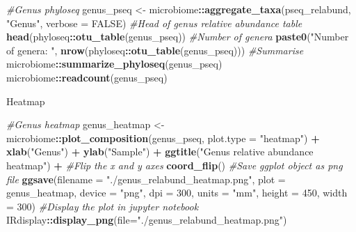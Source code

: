 \documentclass[
]{book}
\newenvironment{Shaded}{\begin{snugshade}}{\end{snugshade}}
\newcommand{\AttributeTok}[1]{\textcolor[rgb]{0.13,0.29,0.53}{#1}}
\newcommand{\CommentTok}[1]{\textcolor[rgb]{0.56,0.35,0.01}{\textit{#1}}}
\newcommand{\ConstantTok}[1]{\textcolor[rgb]{0.56,0.35,0.01}{#1}}
\newcommand{\DecValTok}[1]{\textcolor[rgb]{0.00,0.00,0.81}{#1}}
\newcommand{\FunctionTok}[1]{\textcolor[rgb]{0.13,0.29,0.53}{\textbf{#1}}}
\newcommand{\NormalTok}[1]{#1}
\newcommand{\OtherTok}[1]{\textcolor[rgb]{0.56,0.35,0.01}{#1}}
\newcommand{\SpecialCharTok}[1]{\textcolor[rgb]{0.81,0.36,0.00}{\textbf{#1}}}
\newcommand{\StringTok}[1]{\textcolor[rgb]{0.31,0.60,0.02}{#1}}
\begin{document}
\begin{Shaded}
\begin{Highlighting}[]
\CommentTok{\#Genus phyloseq}
\NormalTok{genus\_pseq }\OtherTok{\textless{}{-}}\NormalTok{ microbiome}\SpecialCharTok{::}\FunctionTok{aggregate\_taxa}\NormalTok{(pseq\_relabund, }\StringTok{"Genus"}\NormalTok{, }\AttributeTok{verbose =} \ConstantTok{FALSE}\NormalTok{)}
\CommentTok{\#Head of genus relative abundance table}
\FunctionTok{head}\NormalTok{(phyloseq}\SpecialCharTok{::}\FunctionTok{otu\_table}\NormalTok{(genus\_pseq))}
\CommentTok{\#Number of genera}
\FunctionTok{paste0}\NormalTok{(}\StringTok{"Number of genera: "}\NormalTok{, }\FunctionTok{nrow}\NormalTok{(phyloseq}\SpecialCharTok{::}\FunctionTok{otu\_table}\NormalTok{(genus\_pseq)))}
\CommentTok{\#Summarise}
\NormalTok{microbiome}\SpecialCharTok{::}\FunctionTok{summarize\_phyloseq}\NormalTok{(genus\_pseq)}
\NormalTok{microbiome}\SpecialCharTok{::}\FunctionTok{readcount}\NormalTok{(genus\_pseq)}
\end{Highlighting}
\end{Shaded}

Heatmap

\begin{Shaded}
\begin{Highlighting}[]
\CommentTok{\#Genus heatmap}
\NormalTok{genus\_heatmap }\OtherTok{\textless{}{-}}\NormalTok{ microbiome}\SpecialCharTok{::}\FunctionTok{plot\_composition}\NormalTok{(genus\_pseq, }\AttributeTok{plot.type =} \StringTok{"heatmap"}\NormalTok{) }\SpecialCharTok{+}
  \FunctionTok{xlab}\NormalTok{(}\StringTok{"Genus"}\NormalTok{) }\SpecialCharTok{+} \FunctionTok{ylab}\NormalTok{(}\StringTok{"Sample"}\NormalTok{) }\SpecialCharTok{+}
  \FunctionTok{ggtitle}\NormalTok{(}\StringTok{"Genus relative abundance heatmap"}\NormalTok{) }\SpecialCharTok{+}
  \CommentTok{\#Flip the x and y axes}
  \FunctionTok{coord\_flip}\NormalTok{()}
\CommentTok{\#Save ggplot object as png file}
\FunctionTok{ggsave}\NormalTok{(}\AttributeTok{filename =} \StringTok{"./genus\_relabund\_heatmap.png"}\NormalTok{, }\AttributeTok{plot =}\NormalTok{ genus\_heatmap,}
       \AttributeTok{device =} \StringTok{"png"}\NormalTok{, }\AttributeTok{dpi =} \DecValTok{300}\NormalTok{, }\AttributeTok{units =} \StringTok{"mm"}\NormalTok{, }\AttributeTok{height =} \DecValTok{450}\NormalTok{, }\AttributeTok{width =} \DecValTok{300}\NormalTok{)}
\CommentTok{\#Display the plot in jupyter notebook}
\NormalTok{IRdisplay}\SpecialCharTok{::}\FunctionTok{display\_png}\NormalTok{(}\AttributeTok{file=}\StringTok{"./genus\_relabund\_heatmap.png"}\NormalTok{)}
\end{Highlighting}
\end{Shaded}
\end{document}
